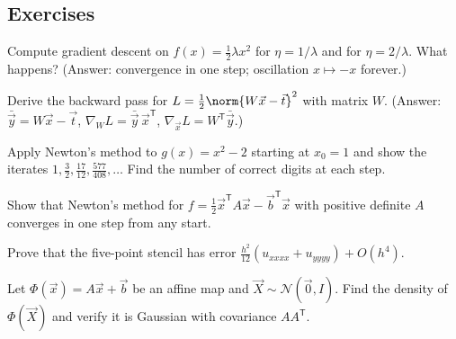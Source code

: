 \subsection*{Exercises}
\begin{exercise}
Compute gradient descent on $f(x)=\frac12\lambda x^2$ for $\eta=1/\lambda$ and for $\eta=2/\lambda$. What happens? (Answer: convergence in one step; oscillation $x\mapsto-x$ forever.)
\end{exercise}
\begin{exercise}
Derive the backward pass for $L=\frac12\norm{W\vec x-\vec t}^2$ with matrix $W$. (Answer: $\bar{\vec y}=W\vec x-\vec t$, $\nabla_WL=\bar{\vec y}\,\vec x^{\mathsf T}$, $\nabla_{\vec x}L=W^{\mathsf T}\bar{\vec y}$.)
\end{exercise}
\begin{exercise}
Apply Newton's method to $g(x)=x^2-2$ starting at $x_0=1$ and show the iterates $1,\frac32,\frac{17}{12},\frac{577}{408},\dots$ Find the number of correct digits at each step.
\end{exercise}
\begin{exercise}
Show that Newton's method for $f=\frac12\vec x^{\mathsf T}A\vec x-\vec b^{\mathsf T}\vec x$ with positive definite $A$ converges in one step from any start.
\end{exercise}
\begin{exercise}
Prove that the five-point stencil has error $\frac{h^2}{12}(u_{xxxx}+u_{yyyy})+O(h^4)$.
\end{exercise}
\begin{exercise}
Let $\Phi(\vec x)=A\vec x+\vec b$ be an affine map and $\vec X\sim\mathcal N(\vec0,I)$. Find the density of $\Phi(\vec X)$ and verify it is Gaussian with covariance $AA^{\mathsf T}$.
\end{exercise}
